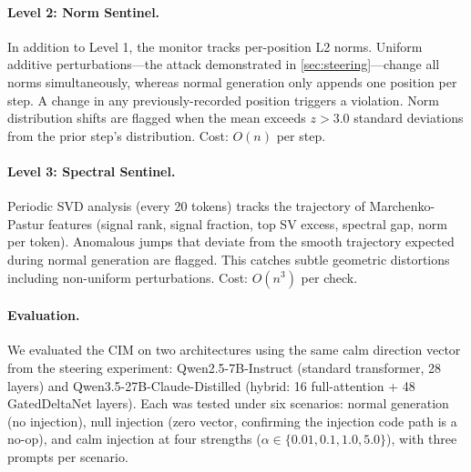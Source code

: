 \paragraph{Level 2: Norm Sentinel.}
In addition to Level 1, the monitor tracks per-position L2 norms.
Uniform additive perturbations---the attack demonstrated in
\cref{sec:steering}---change all norms simultaneously, whereas normal
generation only appends one position per step. A change in any
previously-recorded position triggers a violation. Norm distribution
shifts are flagged when the mean exceeds $z > 3.0$ standard deviations
from the prior step's distribution. Cost: $O(n)$ per step.

\paragraph{Level 3: Spectral Sentinel.}
Periodic SVD analysis (every 20 tokens) tracks the trajectory of
Marchenko-Pastur features (signal rank, signal fraction, top SV excess,
spectral gap, norm per token). Anomalous jumps that deviate from the
smooth trajectory expected during normal generation are flagged. This
catches subtle geometric distortions including non-uniform perturbations.
Cost: $O(n^3)$ per check.

\paragraph{Evaluation.}
We evaluated the CIM on two architectures using the same calm direction
vector from the steering experiment: Qwen2.5-7B-Instruct (standard
transformer, 28 layers) and Qwen3.5-27B-Claude-Distilled (hybrid: 16
full-attention + 48 GatedDeltaNet layers). Each was tested under six
scenarios: normal generation (no injection), null injection (zero vector,
confirming the injection code path is a no-op), and calm injection at four
strengths ($\alpha \in \{0.01, 0.1, 1.0, 5.0\}$), with three prompts per
scenario.

